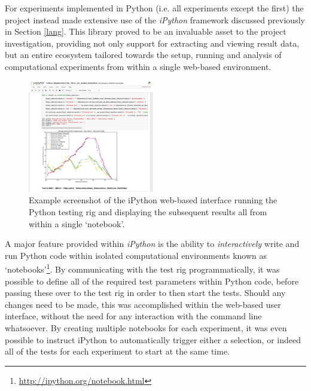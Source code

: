 For experiments implemented in Python (i.e. all experiments except the first) the project instead made extensive use of the \textit{iPython} framework \cite{ipython} discussed previously in Section \ref{lang}. This library proved to be an invaluable asset to the project investigation, providing not only support for extracting and viewing result data, but an entire ecosystem tailored towards the setup, running and analysis of computational experiments from within a single web-based environment. 

\begin{figure}
\vspace{-20pt}
  \begin{center}
    \includegraphics[width=0.49\textwidth]{images/ipython.png}
  \end{center}
  \vspace{-10pt}
  \caption{Example screenshot of the iPython web-based interface running the Python testing rig and displaying the subsequent results all from within a single `notebook'.}
     \label{fig:ipython}
  \vspace{-10pt}
\end{figure}

A major feature provided within \textit{iPython} is the ability to \textit{interactively} write and run Python code within isolated computational environments known as `notebooks'\footnote{\url{http://ipython.org/notebook.html}}. By communicating with the test rig programmatically, it was possible to define all of the required test parameters within Python code, before passing these over to the test rig in order to then start the tests. Should any changes need to be made, this was accomplished within the web-based user interface, without the need for any interaction with the command line whatsoever. By creating multiple notebooks for each experiment, it was even possible to instruct iPython to automatically trigger either a selection, or indeed all of the tests for each experiment to start at the same time. 


